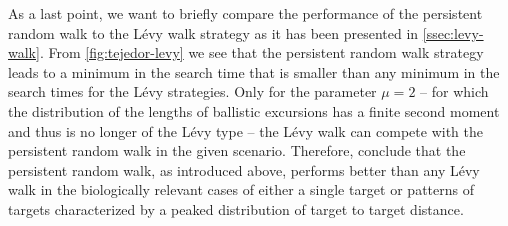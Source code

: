 As a last point, we want to briefly compare the performance of the persistent random walk to the Lévy walk strategy as it has been presented in \autoref{ssec:levy-walk}. From \autoref{fig:tejedor-levy} we see that the persistent random walk strategy leads to a minimum in the search time that is smaller than any minimum in the search times for the Lévy strategies. Only for the parameter $\mu = 2$ -- for which the distribution of the lengths of ballistic excursions has a finite second moment and thus is no longer of the Lévy type -- the Lévy walk can compete with the persistent random walk in the given scenario. Therefore, \citeauthor{tejedor:2012} \cite{tejedor:2012} conclude that the persistent random walk, as introduced above, performs better than any Lévy walk in the biologically relevant cases of either a single target or patterns of targets characterized by a peaked distribution of target to target distance.


